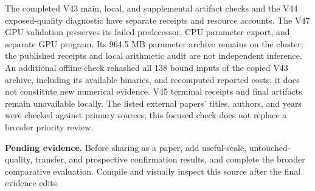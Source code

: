 \documentclass[10pt,twocolumn,letterpaper]{article}
\newcommand{\pending}[1]{\par\noindent\textbf{Pending evidence.} #1\par}
\begin{document}
The completed V43 main, local, and supplemental artifact checks and the V44
exposed-quality diagnostic have separate receipts and resource accounts. The
V47 GPU validation preserves its failed predecessor, CPU parameter export, and
separate GPU program. Its 964.5 MB parameter archive remains on the cluster; the
published receipts and local arithmetic audit are not independent inference.
An additional offline check rehashed all 138 bound inputs of the copied V43
archive, including its available binaries, and recomputed reported costs; it
does not constitute new numerical evidence. V45 terminal receipts and final
artifacts remain unavailable locally. The listed external papers' titles,
authors, and years were checked against primary
sources; this focused check does not replace a broader priority review.

\pending{Before sharing as a paper, add useful-scale, untouched-quality,
transfer, and prospective confirmation results, and complete the broader
comparative evaluation. Compile and visually inspect this source after the final
evidence edits.}
\end{document}
